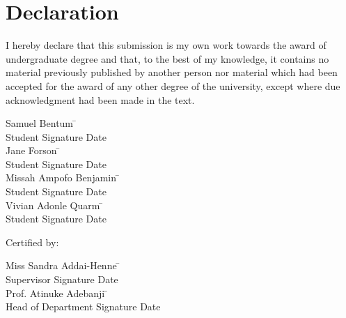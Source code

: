 \documentclass[12pt]{report}
\begin{document}
\section*{Declaration}

I hereby declare that this submission is my own work towards the award of undergraduate degree and that, to the best of my knowledge, it contains no material previously published by another person nor material which had been accepted for the award of any other degree of the university, except where due acknowledgment had been made in the text.

\vspace{1cm}

\begin{tabbing}
Samuel Bentum \hspace{5cm} \= \dotfill \\
\> Student Signature \hspace{1cm} Date \\
Jane Forson \hspace{5cm} \= \dotfill \\
\> Student Signature \hspace{1cm} Date \\
Missah Ampofo Benjamin \hspace{5cm} \= \dotfill \\
\> Student Signature \hspace{1cm} Date \\
Vivian Adonle Quarm \hspace{5cm} \= \dotfill \\
\> Student Signature \hspace{1cm} Date \\
\end{tabbing}

\vspace{1cm}

Certified by:

\vspace{1cm}

\begin{tabbing}
Miss Sandra Addai-Henne \hspace{5cm} \= \dotfill \\
\> Supervisor Signature \hspace{1cm} Date \\
Prof. Atinuke Adebanji \hspace{5cm} \= \dotfill \\
\> Head of Department Signature \hspace{1cm} Date \\
\end{tabbing}
\end{document}
